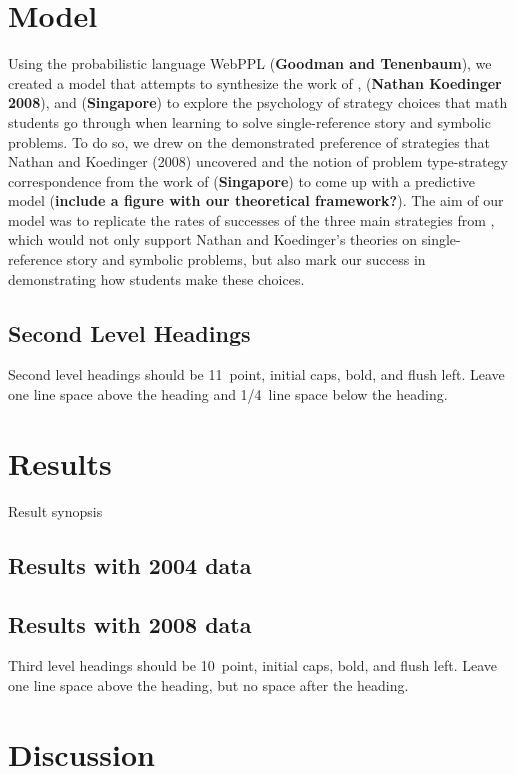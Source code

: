 \documentclass[10pt,letterpaper]{article}
\begin{document}
\section{Model}

Using the probabilistic language WebPPL (\textbf{Goodman and Tenenbaum}), we created a model that attempts to synthesize the work of , (\textbf{Nathan Koedinger 2008}), and (\textbf{Singapore}) to explore the psychology of strategy choices that math students go through when learning to solve single-reference story and symbolic problems. To do so, we drew on the demonstrated preference of strategies that Nathan and Koedinger (2008) uncovered and the notion of problem type-strategy correspondence from the work of (\textbf{Singapore}) to come up with a predictive model (\textbf{include a figure with our theoretical framework?}). The aim of our model was to replicate the rates of successes of the three main strategies from , which would not only support Nathan and Koedinger's theories on single-reference story and symbolic problems, but also mark our success in demonstrating how students make these choices.


\subsection{Second Level Headings}

Second level headings should be 11~point, initial caps, bold, and
flush left. Leave one line space above the heading and 1/4~line
space below the heading.

\section{Results}

Result synopsis

\subsection{Results with 2004 data}

\subsection{Results with 2008 data}

Third level headings should be 10~point, initial caps, bold, and flush
left. Leave one line space above the heading, but no space after the
heading.


\section{Discussion}
\end{document}
